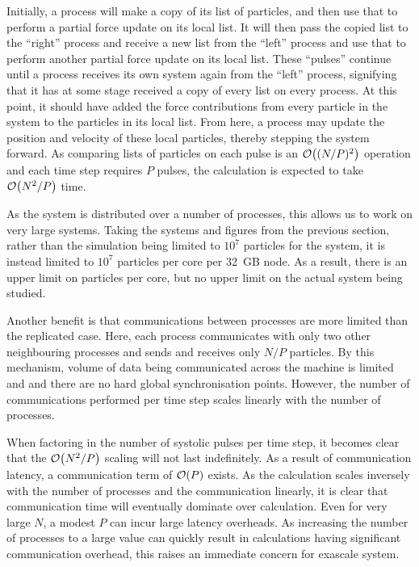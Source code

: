 Initially, a process will make a copy of its list of particles,
and then use that to perform a partial force update on its local list.
%
It will then pass the copied list to the ``right'' process and
receive a new list from the ``left'' process and use that to perform
another partial force update on its local list.
%
These ``pulses'' continue until a process receives its own system again from
the ``left'' process, signifying that it has at some stage received
a copy of every list on every process.
%
At this point, it should have added the force contributions from
every particle in the system to the particles in its local list.
%
From here, a process may update the position and velocity of these local
particles, thereby stepping the system forward.
%
As comparing lists of particles on each pulse is an $\mathcal{O}{\left({ (N/P)^2 }\right)}$ operation
and each time step requires $P$ pulses, the calculation is expected to take
$\mathcal{O}{\left({ N^2/P }\right)}$ time.


%
As the system is distributed over a number of processes, this allows
us to work on very large systems.
%
Taking the systems and figures from the previous section,
rather than the simulation being limited to $10^7$ particles for the system,
it is instead limited to $10^7$ particles per core per 32~GB node.
%
As a result, there is an upper limit on particles per core, but no
upper limit on the actual system being studied.

Another benefit is that
communications between processes are more limited than
the replicated case.
%
Here, each process communicates with only two other neighbouring processes
and sends and receives only $N/P$ particles.
%
By this mechanism, volume of data
being communicated across the machine is limited
and and there are no hard global synchronisation points.
%
However, the number of communications performed per time step
scales linearly with the number of processes.

When factoring in the number of systolic pulses per time step,
it becomes clear that the $\mathcal{O}{\left({ N^2/P }\right)}$ scaling will not last indefinitely.
%
As a result of communication latency, a communication term of
$\mathcal{O}{\left({ P }\right)}$ exists.
%
As the calculation scales inversely with the number of processes
and the communication linearly, it is clear that communication time will
eventually dominate over calculation.
%
Even for very large $N$, a modest $P$ can incur large latency overheads.
%
As increasing the number of processes to a large value
can quickly result in calculations having significant communication overhead,
this raises an immediate concern for exascale system.
